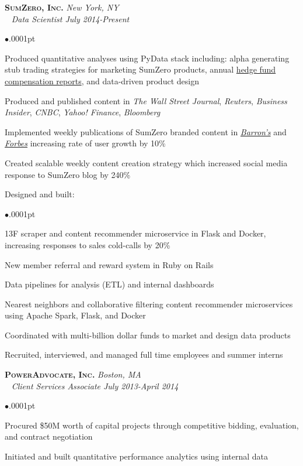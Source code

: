 \documentclass[11pt]{article}
\newcommand{\employer}[4]{{\hspace*{-20pt} {\small{\textbf{\textsc{ #1}}}}
  \hfill \small{\emph{#2}}\\ ~\hspace*{-20pt} \small \emph{ #3 \hfill #4}}\\ }
\newenvironment{achievements}{\begin{list}{$\bullet$}{\topsep .0001pt \itemsep -2pt}}{\vspace*{5pt}\end{list} }
\begin{document}
\employer{SumZero, Inc.}{New York, NY}{Data Scientist}{July 2014-Present}
	\begin{achievements}
	\item Produced quantitative analyses using PyData stack including: alpha generating stub trading strategies for marketing SumZero products, annual \href{https://sumzero.com/sp/szcomp2017}{hedge fund compensation reports}, and data-driven product design 
	\item Produced and published content in \emph{The Wall Street Journal}, \emph{Reuters}, \emph{Business Insider}, \emph{CNBC}, \emph{Yahoo! Finance}, \emph{Bloomberg}
	\item Implemented weekly publications of SumZero branded content in \href{http://www.barrons.com/search?keyword=view+from+the+buyside+sumzero&numResults=15&sort=date-desc&author=&searchWindow=0&minDate=&maxDate=&source=barrons}{\emph{Barron's}} and \href{https://www.forbes.com/sites/lukeschiefelbein/#7442bc65216e}{\emph{Forbes}} increasing rate of user growth by 10\%
	\item Created scalable weekly content creation strategy which increased social media response to SumZero blog by 240\%
	\item Designed and built:
	\begin{achievements}
	\item 13F scraper and content recommender microservice in Flask and Docker, increasing responses to sales cold-calls by 20\%
	\item New member referral and reward system in Ruby on Rails
	\item Data pipelines for analysis (ETL) and internal dashboards
	\item Nearest neighbors and collaborative filtering content recommender microservices using Apache Spark, Flask, and Docker
	\end{achievements}
	\item Coordinated with multi-billion dollar funds to market and design data products
	\item Recruited, interviewed, and managed full time employees and summer interns
	\end{achievements}

\employer{PowerAdvocate, Inc.} {Boston, MA} {Client Services Associate} {July 2013-April 2014}
	\begin{achievements}
	\item Procured \$50M worth of capital projects through competitive bidding, evaluation, and contract negotiation
	\item Initiated and built quantitative performance analytics using internal data 
	\end{achievements}
\end{document}

